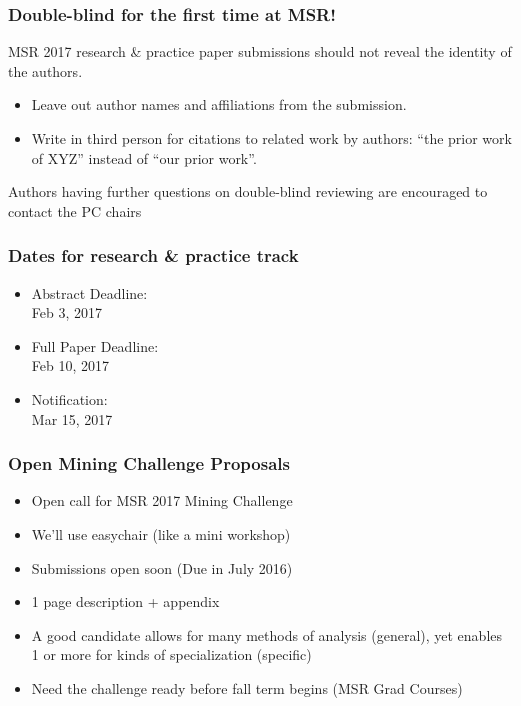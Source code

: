 \documentclass{beamer}
\begin{document}
\begin{frame}
\frametitle{Double-blind for the first time at MSR!}

{\Large
MSR 2017 research \& practice paper submissions should not reveal the identity of the authors.

\begin{itemize}
\item Leave out author names and affiliations from the submission.
\item Write in third person for citations to related work by authors: ``the prior work of XYZ'' instead of ``our prior work''.
\end{itemize}

Authors having further questions on double-blind reviewing are encouraged to contact the PC chairs \\

}

\end{frame}


\begin{frame}
\frametitle{Dates for research \& practice track}

{\Huge
\begin{itemize}
\item Abstract Deadline: \\ Feb 3, 2017
\item Full Paper Deadline: \\  Feb 10, 2017
\item Notification: \\ Mar 15, 2017
\end{itemize}
}
\end{frame}


\begin{frame}
\frametitle{Open Mining Challenge Proposals}

{\Large
\begin{itemize}
\item Open call for MSR 2017 Mining Challenge
\item We’ll use easychair (like a mini workshop)
\item Submissions open soon (Due in July 2016)
\item 1 page description + appendix
\item A good candidate allows for many methods of analysis (general), yet enables 1 or more for kinds of specialization (specific)
\item Need the challenge ready before fall term begins (MSR Grad Courses)
\end{itemize}
}

\end{frame}
\end{document}
